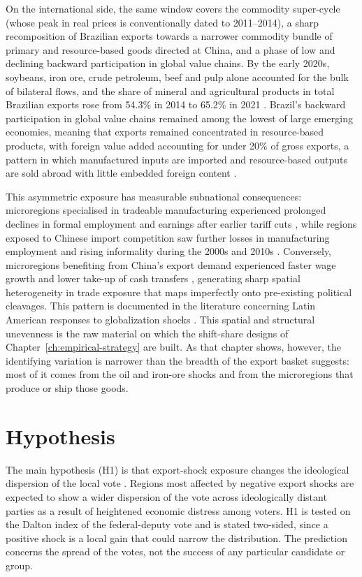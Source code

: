 \documentclass[
	11pt,				%
	oneside,			%
	a4paper,			%
	english,			%
	english				%
	]{abntex2ppgsi}
\theoremstyle{plain}
\theoremstyle{remark}
\theoremstyle{plain}%
\theoremstyle{remark}%
\begin{document}
On the international side, the same window covers the commodity super-cycle (whose peak in real prices is conventionally
dated to 2011--2014), a sharp recomposition of Brazilian exports
towards a narrower commodity bundle of primary and resource-based goods directed at China, and a phase
of low and declining backward participation in global value chains. By the early 2020s, soybeans, iron ore, crude
petroleum, beef and pulp alone accounted for the bulk of bilateral
flows, and the share of mineral and agricultural products in total
Brazilian exports rose from 54.3\% in 2014 to 65.2\% in 2021
\cite{callegari,iedi}.
Brazil's backward participation in global value chains remained among the lowest of large emerging economies, meaning that exports remained concentrated in resource-based products, with foreign value added accounting for under 20\% of gross exports, a pattern in which manufactured inputs are imported and resource-based outputs are sold abroad with little embedded foreign content \cite{callegari}.


This asymmetric exposure has measurable subnational consequences:
microregions specialised in tradeable manufacturing experienced
prolonged declines in formal employment and earnings after earlier
tariff cuts \cite{Dix1}, while regions exposed
to Chinese import competition saw further losses in manufacturing
employment and rising informality during the 2000s and 2010s
\cite{paz2019,paz2022}. Conversely, microregions benefiting
from China's export demand experienced faster wage growth and
lower take-up of cash transfers \cite{costa2012}, generating sharp spatial heterogeneity in
trade exposure that maps imperfectly onto pre-existing political
cleavages. This pattern is documented in the literature concerning Latin American responses to globalization shocks \cite{dix2025, costa2012}. This spatial and structural unevenness is the raw material on which the
shift-share designs of Chapter~\ref{ch:empirical-strategy} are built. As that chapter shows, however, the identifying variation is narrower than the breadth of the export basket suggests: most of it comes from the oil and iron-ore shocks and from the microregions that produce or ship those goods.



\section{Hypothesis}
\label{sec:hypothesis}


The main hypothesis (H1) is that export-shock exposure changes the ideological dispersion of the local vote \cite{Rodrik}. Regions most affected by negative export shocks are expected to show a wider dispersion of the vote across ideologically distant parties as a result of heightened economic distress among voters. H1 is tested on the Dalton index of the federal-deputy vote and is stated two-sided, since a positive shock is a local gain that could narrow the distribution. The prediction concerns the spread of the votes, not the success of any particular candidate or group.
\end{document}
